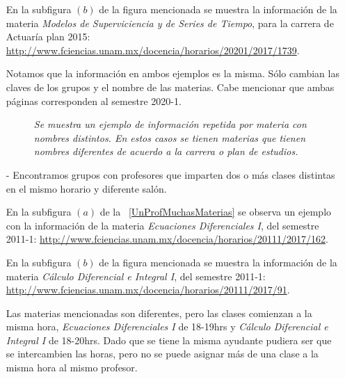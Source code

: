 \begin{itemize}
En la subfigura $(b)$ de la figura mencionada se muestra la información de la materia \textit{Modelos de Superviciencia y de Series de Tiempo}, para la carrera de Actuaría plan 2015: \url{http://www.fciencias.unam.mx/docencia/horarios/20201/2017/1739}.

Notamos que la información en ambos ejemplos es la misma. Sólo cambian las claves de los grupos y el nombre de las materias. Cabe mencionar que ambas páginas corresponden al semestre 2020-1.

\begin{figure}[H]
	\centering
	\caption[\textit{Información repetida: Materia con nombres distintos}]{\textit{Se muestra un ejemplo de información repetida por materia con nombres distintos. En estos casos se tienen materias que tienen nombres diferentes de acuerdo a la carrera o plan de estudios.}}\label{MateriaNombresDistintos}
\end{figure}

\item[-] Encontramos grupos con profesores que imparten dos o más clases distintas en el mismo horario y diferente salón.

En la subfigura $(a)$ de la \figurename{~\ref{UnProfMuchasMaterias}} se observa un ejemplo con la información de la materia \textit{Ecuaciones Diferenciales I}, del semestre 2011-1: \url{http://www.fciencias.unam.mx/docencia/horarios/20111/2017/162}.

En la subfigura $(b)$ de la figura mencionada se muestra la información de la materia \textit{Cálculo Diferencial e Integral I}, del semestre 2011-1: \url{http://www.fciencias.unam.mx/docencia/horarios/20111/2017/91}.

Las materias mencionadas son diferentes, pero las clases comienzan a la misma hora, \textit{Ecuaciones Diferenciales I} de 18-19hrs y \textit{Cálculo Diferencial e Integral I} de 18-20hrs. Dado que se tiene la misma ayudante pudiera ser que se intercambien las horas, pero no se puede asignar más de una clase a la misma hora al mismo profesor.



\end{itemize}
